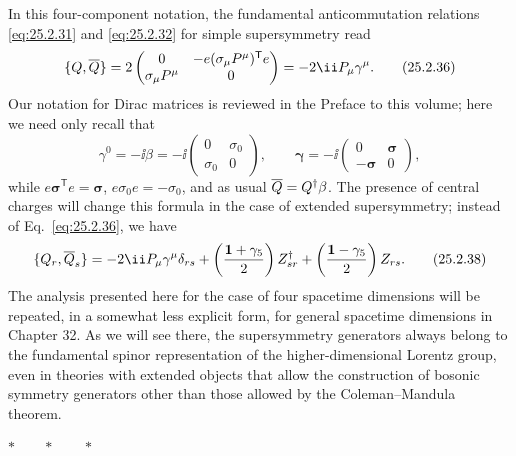 In this four-component notation, the fundamental anticommutation relations
\eqref{eq:25.2.31} and \eqref{eq:25.2.32} for simple supersymmetry read
\begin{equation}
\{\MajoranaQ,\overline{\MajoranaQ}\}
=2
\begin{pmatrix}
0&-e(\sigma_\mu P^\mu)^{\mathsf T} e\\
\sigma_\mu P^\mu&0
\end{pmatrix}
=-2\ii P_\mu\gamma^\mu.
\tag{25.2.36}\label{eq:25.2.36}
\end{equation}
Our notation for Dirac matrices is reviewed in the Preface to this volume;
here we need only recall that
\begin{equation}
\gamma^0=-\ii\beta
=-\ii
\begin{pmatrix}
0&\sigma_0\\
\sigma_0&0
\end{pmatrix},
\qquad
\boldsymbol{\gamma}
=-\ii
\begin{pmatrix}
0&\boldsymbol{\sigma}\\
-\boldsymbol{\sigma}&0
\end{pmatrix},
\tag{25.2.37}\label{eq:25.2.37}
\end{equation}
while \(e\boldsymbol{\sigma}^{\mathsf T} e=\boldsymbol{\sigma}\),
\(e\sigma_0e=-\sigma_0\), and as usual
\(\overline{Q}=Q^\dagger\beta\). The presence of central
charges will change this formula in the case of extended supersymmetry;
instead of Eq.~\eqref{eq:25.2.36}, we have
\begin{equation}
\{\MajoranaQ_r,\overline{\MajoranaQ}_s\}
=-2\ii P_\mu\gamma^\mu\delta_{rs}
+\left(\frac{\mathbf{1}+\gamma_5}{2}\right)Z_{sr}^\dagger
+\left(\frac{\mathbf{1}-\gamma_5}{2}\right)Z_{rs}.
\tag{25.2.38}\label{eq:25.2.38}
\end{equation}
The analysis presented here for the case of four spacetime dimensions will
be repeated, in a somewhat less explicit form, for general spacetime
dimensions in Chapter 32. As we will see there, the supersymmetry generators
always belong to the fundamental spinor representation of the
higher-dimensional Lorentz group, even in theories with extended objects
that allow the construction of bosonic symmetry generators other than those
allowed by the Coleman--Mandula theorem.

\begin{center}
\(\ast\qquad\ast\qquad\ast\)
\end{center}

